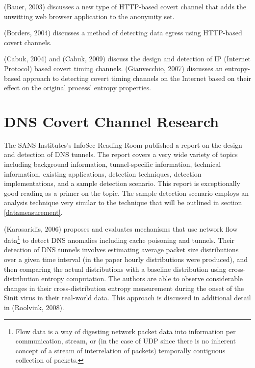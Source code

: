 \documentclass[12pt]{report}
\theoremstyle{remark}
\theoremstyle{definition}
\theoremstyle{definition}
\theoremstyle{definition}
\begin{document}
(Bauer, 2003)\cite{Bauer2003} discusses a new type of HTTP-based covert channel
that adds the unwitting web browser application to the anonymity set.

(Borders, 2004)\cite{Borders2004} discusses a method of detecting data egress
using HTTP-based covert channels.

(Cabuk, 2004)\cite{Cabuk2004} and (Cabuk, 2009)\cite{Cabuk2009} discuss the
design and detection of IP (Internet Protocol) based covert timing channels.
(Gianvecchio, 2007)\cite{Gianvecchio2007} discusses an entropy-based approach to
detecting covert timing channels on the Internet based on their effect on the
original process' entropy properties.

\section{DNS Covert Channel Research}
The SANS Institutes's InfoSec Reading Room published a report on the design and
detection of DNS tunnels\cite{SANS2013}. The report covers a very wide variety
of topics including background information, tunnel-specific information,
technical information, existing applications, detection techniques, detection
implementations, and a sample detection scenario. This report is exceptionally
good reading as a primer on the topic. The sample detection scenario employs an
analysis technique very similar to the technique that will be outlined in
section \ref{datameasurement}.

(Karasaridis, 2006)\cite{Karasaridis2006} proposes and evaluates mechanisms that
use network flow data\footnote{Flow data is a way of digesting network packet
data into information per communication, stream, or (in the case of UDP since
there is no inherent concept of a stream of interrelation of packets) temporally
contiguous collection of packets.} to detect DNS anomalies including cache
poisoning and tunnels. Their detection of DNS tunnels involves estimating
average packet size distributions over a given time interval (in the paper
hourly distributions were produced), and then comparing the actual distributions
with a baseline distribution using cross-distribution entropy computation. The
authors are able to observe considerable changes in their cross-distribution
entropy measurement during the onset of the Sinit virus in their real-world
data. This approach is discussed in additional detail in (Roolvink,
2008)\cite{Roolvink2008}.
\end{document}
